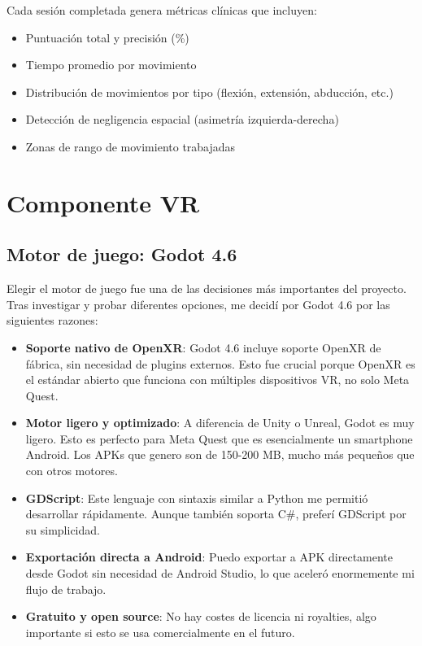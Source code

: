 Cada sesión completada genera métricas clínicas que incluyen:
\begin{itemize}
    \item Puntuación total y precisión (\%)
    \item Tiempo promedio por movimiento
    \item Distribución de movimientos por tipo (flexión, extensión, abducción, etc.)
    \item Detección de negligencia espacial (asimetría izquierda-derecha)
    \item Zonas de rango de movimiento trabajadas
\end{itemize}

\section{Componente VR}

\subsection{Motor de juego: Godot 4.6}

Elegir el motor de juego fue una de las decisiones más importantes del proyecto. Tras investigar y probar diferentes opciones, me decidí por Godot 4.6 por las siguientes razones:

\begin{itemize}
    \item \textbf{Soporte nativo de OpenXR}: Godot 4.6 incluye soporte OpenXR de fábrica, sin necesidad de plugins externos. Esto fue crucial porque OpenXR es el estándar abierto que funciona con múltiples dispositivos VR, no solo Meta Quest.
    
    \item \textbf{Motor ligero y optimizado}: A diferencia de Unity o Unreal, Godot es muy ligero. Esto es perfecto para Meta Quest que es esencialmente un smartphone Android. Los APKs que genero son de 150-200 MB, mucho más pequeños que con otros motores.
    
    \item \textbf{GDScript}: Este lenguaje con sintaxis similar a Python me permitió desarrollar rápidamente. Aunque también soporta C\#, preferí GDScript por su simplicidad.
    
    \item \textbf{Exportación directa a Android}: Puedo exportar a APK directamente desde Godot sin necesidad de Android Studio, lo que aceleró enormemente mi flujo de trabajo.
    
    \item \textbf{Gratuito y open source}: No hay costes de licencia ni royalties, algo importante si esto se usa comercialmente en el futuro.
\end{itemize}

